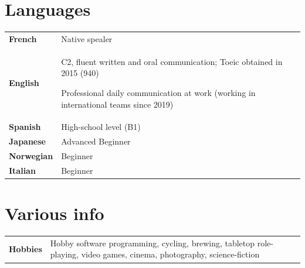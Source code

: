 \documentclass[11pt,a4paper]{article}
\newlength{\colone}
\newlength{\coltwo}
\begin{document}
\section{Languages}
\begin{longtable}{@{}p{\colone}p{\coltwo}@{}}
	\bfseries French	& Native spealer \\
	\bfseries English 	& C2, fluent written and oral communication; {\sc Toeic} obtained in 2015 (940) \par
		Professional daily communication at work (working in international teams since 2019) \\
	\bfseries Spanish 	& High-school level (B1) \\
	\bfseries Japanese 	& Advanced Beginner \\
	\bfseries Norwegian & Beginner \\
	\bfseries Italian 	& Beginner \\
\end{longtable}


\section{Various info}
\begin{longtable}{@{}p{\colone}p{\coltwo}@{}}
	\bfseries Hobbies
		& Hobby software programming, cycling, brewing, tabletop role-playing, video games, cinema, photography, science-fiction
\end{longtable}
\end{document}
